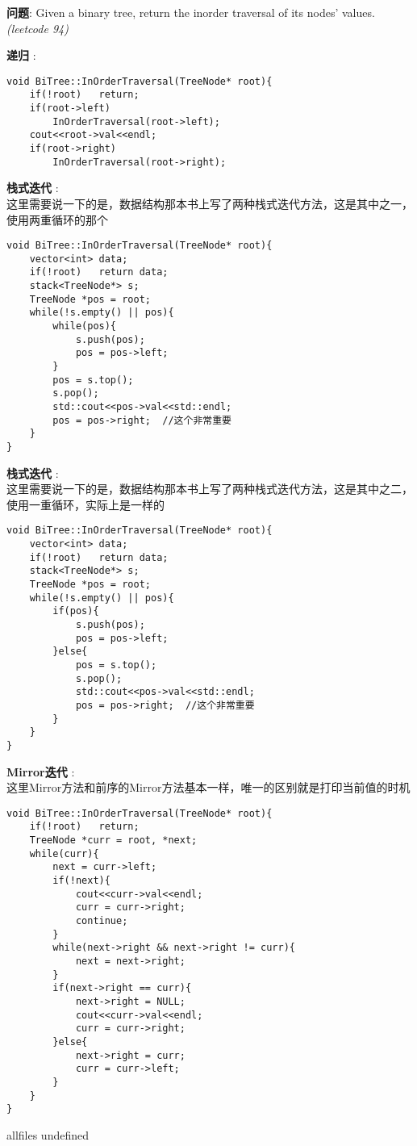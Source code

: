 \documentclass{article}
\begin{document}
\begin{CJK}{UTF8}{gbsn}     %

\else
	
\begin{description}
	\item{\textbf{问题}}: Given a binary tree, return the inorder traversal of its nodes' values. \textit{(leetcode 94)}
	\item{\textbf{递归}} : 
	\\
	\begin{lstlisting}
void BiTree::InOrderTraversal(TreeNode* root){
	if(!root)	return;
	if(root->left)
		InOrderTraversal(root->left);
	cout<<root->val<<endl;
	if(root->right)
		InOrderTraversal(root->right);
	\end{lstlisting}
	\item{\textbf{栈式迭代}} : 
	\\这里需要说一下的是，数据结构那本书上写了两种栈式迭代方法，这是其中之一，使用两重循环的那个
	\begin{lstlisting}
void BiTree::InOrderTraversal(TreeNode* root){
	vector<int> data;
	if(!root)	return data;
	stack<TreeNode*> s;
	TreeNode *pos = root;
	while(!s.empty() || pos){
		while(pos){
			s.push(pos);
			pos = pos->left;
		}
		pos = s.top();
		s.pop();
		std::cout<<pos->val<<std::endl;
		pos = pos->right;  //这个非常重要
	}
}
	\end{lstlisting}
	\item{\textbf{栈式迭代}} : 
	\\这里需要说一下的是，数据结构那本书上写了两种栈式迭代方法，这是其中之二，使用一重循环，实际上是一样的
	\begin{lstlisting}
void BiTree::InOrderTraversal(TreeNode* root){
	vector<int> data;
	if(!root)	return data;
	stack<TreeNode*> s;
	TreeNode *pos = root;
	while(!s.empty() || pos){
		if(pos){
			s.push(pos);
			pos = pos->left;
		}else{
			pos = s.top();
			s.pop();
			std::cout<<pos->val<<std::endl;
			pos = pos->right;  //这个非常重要
		}
	}
}
	\end{lstlisting}
	\item{\textbf{Mirror迭代}} : 
	\\这里Mirror方法和前序的Mirror方法基本一样，唯一的区别就是打印当前值的时机
	\begin{lstlisting}
void BiTree::InOrderTraversal(TreeNode* root){
	if(!root)	return;
	TreeNode *curr = root, *next;
	while(curr){
		next = curr->left;
		if(!next){
			cout<<curr->val<<endl;
			curr = curr->right;
			continue;
		}
		while(next->right && next->right != curr){
			next = next->right;
		}
		if(next->right == curr){
			next->right = NULL;
			cout<<curr->val<<endl;
			curr = curr->right;
		}else{
			next->right = curr;
			curr = curr->left;
		}
	}
}
	\end{lstlisting}
\end{description}

\fi

\ifx allfiles undefined
\end{CJK}
\end{document}
